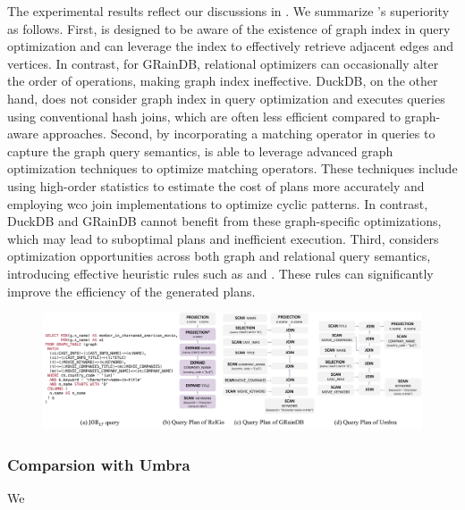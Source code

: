The experimental results reflect our discussions in . We summarize \name's superiority as follows.
First, \name is designed to be aware of the existence of graph index in query optimization and can leverage the index to effectively retrieve adjacent edges and vertices. In contrast, for GRainDB, relational optimizers can occasionally alter the order of \EVjoin operations, making graph index ineffective. DuckDB, on the other hand, does not consider graph index in query optimization and executes queries using conventional hash joins, which are often less efficient compared to graph-aware approaches.
Second, by incorporating a matching operator in \spjm queries to capture the graph query semantics, \name is able to leverage advanced graph optimization techniques to optimize matching operators. These techniques include using high-order statistics to estimate the cost of plans more accurately and employing wco join implementations to optimize cyclic patterns. In contrast, DuckDB and GRainDB cannot benefit from these graph-specific optimizations, which may lead to suboptimal plans and inefficient execution.
Third, \name considers optimization opportunities across both graph and relational query semantics, introducing effective heuristic rules such as \filterrule and \joinfuserule. These rules can significantly improve the efficiency of the generated plans.

\begin{figure}[ht]
    \centering
    \includegraphics[width=.95\linewidth]{./figures/job17a-plan.pdf}
    \caption{}
    \label{fig:job17a-query-plans}
\end{figure}


\subsubsection{Comparsion with Umbra}
We  

